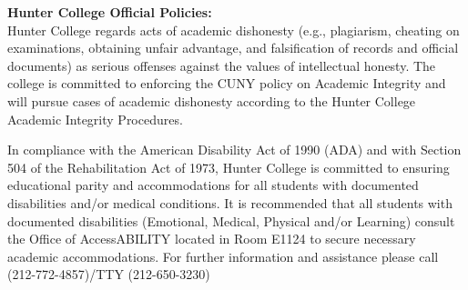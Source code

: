 \documentclass[a4paper]{article}
\begin{document}
\textbf{Hunter College Official Policies:}\\
Hunter College regards acts of academic dishonesty (e.g., plagiarism, cheating on examinations, obtaining
unfair advantage, and falsification of records and official documents) as serious offenses against the values of
intellectual honesty. The college is committed to enforcing the CUNY policy on Academic Integrity and will
pursue cases of academic dishonesty according to the Hunter College Academic Integrity Procedures.
\par In compliance with the American Disability Act of 1990 (ADA) and with Section 504 of the Rehabilitation
Act of 1973, Hunter College is committed to ensuring educational parity and accommodations for all students
with documented disabilities and/or medical conditions. It is recommended that all students with documented
disabilities (Emotional, Medical, Physical and/or Learning) consult the Office of AccessABILITY located in
Room E1124 to secure necessary academic accommodations. For further information and assistance please call
(212-772-4857)/TTY (212-650-3230)\\\\\\
\newpage
\end{document}
